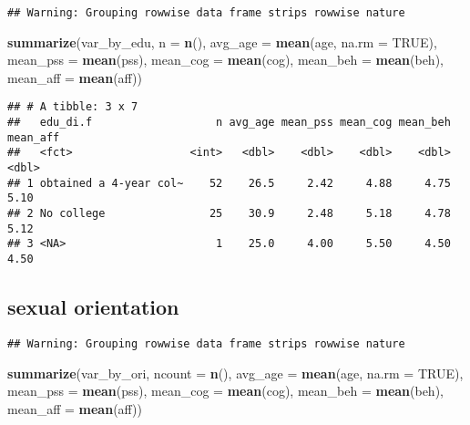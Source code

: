 \documentclass[]{article}
\newenvironment{Shaded}{\begin{snugshade}}{\end{snugshade}}
\newcommand{\KeywordTok}[1]{\textcolor[rgb]{0.13,0.29,0.53}{\textbf{#1}}}
\newcommand{\DataTypeTok}[1]{\textcolor[rgb]{0.13,0.29,0.53}{#1}}
\newcommand{\StringTok}[1]{\textcolor[rgb]{0.31,0.60,0.02}{#1}}
\newcommand{\OtherTok}[1]{\textcolor[rgb]{0.56,0.35,0.01}{#1}}
\newcommand{\OperatorTok}[1]{\textcolor[rgb]{0.81,0.36,0.00}{\textbf{#1}}}
\newcommand{\NormalTok}[1]{#1}
\begin{document}
\begin{verbatim}
## Warning: Grouping rowwise data frame strips rowwise nature
\end{verbatim}

\begin{Shaded}
\begin{Highlighting}[]
\KeywordTok{summarize}\NormalTok{(var_by_edu, }\DataTypeTok{n =} \KeywordTok{n}\NormalTok{(), }\DataTypeTok{avg_age =} \KeywordTok{mean}\NormalTok{(age, }\DataTypeTok{na.rm =} \OtherTok{TRUE}\NormalTok{), }\DataTypeTok{mean_pss =} \KeywordTok{mean}\NormalTok{(pss), }\DataTypeTok{mean_cog =} \KeywordTok{mean}\NormalTok{(cog), }\DataTypeTok{mean_beh =} \KeywordTok{mean}\NormalTok{(beh), }\DataTypeTok{mean_aff =} \KeywordTok{mean}\NormalTok{(aff)) }
\end{Highlighting}
\end{Shaded}

\begin{verbatim}
## # A tibble: 3 x 7
##   edu_di.f                   n avg_age mean_pss mean_cog mean_beh mean_aff
##   <fct>                  <int>   <dbl>    <dbl>    <dbl>    <dbl>    <dbl>
## 1 obtained a 4-year col~    52    26.5     2.42     4.88     4.75     5.10
## 2 No college                25    30.9     2.48     5.18     4.78     5.12
## 3 <NA>                       1    25.0     4.00     5.50     4.50     4.50
\end{verbatim}

\subsection{sexual orientation}\label{sexual-orientation-1}

\begin{Shaded}
\end{Shaded}

\begin{verbatim}
## Warning: Grouping rowwise data frame strips rowwise nature
\end{verbatim}

\begin{Shaded}
\begin{Highlighting}[]
\KeywordTok{summarize}\NormalTok{(var_by_ori, }\DataTypeTok{ncount =} \KeywordTok{n}\NormalTok{(), }\DataTypeTok{avg_age =} \KeywordTok{mean}\NormalTok{(age, }\DataTypeTok{na.rm =} \OtherTok{TRUE}\NormalTok{), }\DataTypeTok{mean_pss =} \KeywordTok{mean}\NormalTok{(pss), }\DataTypeTok{mean_cog =} \KeywordTok{mean}\NormalTok{(cog), }\DataTypeTok{mean_beh =} \KeywordTok{mean}\NormalTok{(beh), }\DataTypeTok{mean_aff =} \KeywordTok{mean}\NormalTok{(aff))}
\end{Highlighting}
\end{Shaded}
\end{document}
